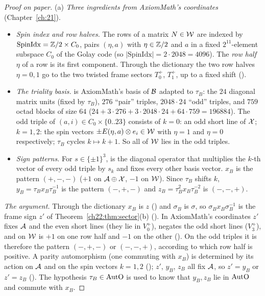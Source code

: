 \begin{proof}[Proof on paper]
(a) \emph{Three ingredients from AxiomMath's coordinates} (Chapter~\ref{ch:21}).
\begin{itemize}
\item \emph{Spin index and row halves.}  The rows of a matrix $N\in\mathcal{W}$ are indexed by
  $\mathrm{SpinIdx}={\mathbb{Z}}/2\times C_0$, pairs $(\eta,a)$ with $\eta\in{\mathbb{Z}}/2$ and $a$ in a fixed $2^{11}$-element subspace $C_0$ of
  the Golay code (so $|\mathrm{SpinIdx}|=2\cdot2048=4096$).  The \emph{row half}
  $\eta$ of a row is its first component.  Through the dictionary the two row halves $\eta=0,1$ go to the two twisted frame
  sectors $T_0^+$, $T_1^+$, up to a fixed shift ().
\item \emph{The triality basis.}   is AxiomMath's basis of $\mathcal{B}$ adapted to $\tau_B$: the $24$ diagonal
  matrix units (fixed by $\tau_B$), $276$ ``pair'' triples, $2048\cdot24$ ``odd'' triples, and $759$ octad blocks of size $64$ ($24+3\cdot276+3\cdot2048\cdot24+64\cdot759=196884$).
  The odd triple of $(a,i)\in C_0\times\{0..23\}$ consists of $k=0$: an odd short line of $\mathcal{X}$; $k=1,2$: the spin
  vectors $\pm E(\eta,a)\otimes e_i\in\mathcal{W}$ with $\eta=1$ and $\eta=0$ respectively; $\tau_B$ cycles $k\mapsto k+1$.  So
  all of $\mathcal{W}$ lies in the odd triples.
\item \emph{Sign patterns.}  For $s\in\{\pm1\}^3$,  is the diagonal operator that multiplies the $k$-th vector of
  every odd triple by $s_k$ and fixes every other basis vector.  $x_B$ is the pattern $(+,-,-)$ ($+1$ on $\mathcal{A}\oplus
  \mathcal{X}$, $-1$ on $\mathcal{W}$).  Since $\tau_B$ shifts $k$, $y_B=\tau_Bx_B\tau_B^{-1}$ is the pattern $(-,+,-)$ and
  $z_B=\tau_B^2x_B\tau_B^{-2}$ is $(-,-,+)$.
\end{itemize}
\emph{The argument.}  Through the dictionary $x_B$ is $z$ () and $\sigma_B$ is $\sigma$, so
$\sigma_Bx_B\sigma_B^{-1}$ is the frame sign $z'$ of Theorem~\ref{ch22:thm:sector}(b) ().  In
AxiomMath's coordinates $z'$ fixes $\mathcal{A}$ and the even short lines (they lie in $V_0^+$), negates the odd short lines
($V_3^+$), and on $\mathcal{W}$ is $+1$ on one row half and $-1$ on the other ().  On the odd
triples it is therefore the pattern $(-,+,-)$ or $(-,-,+)$, according to which row half is positive.  A parity automorphism
(one commuting with $x_B$) is determined by its action on $\mathcal{A}$ and on the spin vectors $k=1,2$
(); $z'$, $y_B$, $z_B$ all fix $\mathcal{A}$, so $z'=y_B$ or $z'=z_B$
().  The hypothesis $\tau_B\in\mathrm{AutO}$ is used to know that $y_B,z_B$ lie in
$\mathrm{AutO}$ and commute with $x_B$.


\end{proof}
